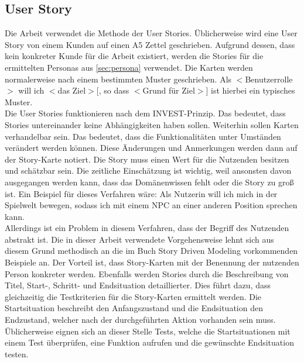 \subsection{User Story}\label{sec:user-story}
Die Arbeit verwendet die Methode der User Stories\cite{scrum-user-stories}.
Üblicherweise wird eine User Story von einem Kunden auf einen A5 Zettel geschrieben.
Aufgrund dessen, dass kein konkreter Kunde für die Arbeit existiert, werden die Stories für die ermittelten Personas aus \autoref{sec:persona} verwendet.
Die Karten werden normalerweise nach einem bestimmten Muster geschrieben.
\glqq Als $<$Benutzerrolle$>$ will ich $<$das Ziel$>$[, so dass $<$Grund für Ziel$>$]\grqq{} ist hierbei ein typisches Muster.\\

Die User Stories funktionieren nach dem \ac{INVEST}-Prinzip\cite{user-stories}.
Das bedeutet, dass Stories untereinander keine Abhängigkeiten haben sollen.
Weiterhin sollen Karten verhandelbar sein.
Das bedeutet, dass die Funktionalitäten unter Umständen verändert werden können.
Diese Änderungen und Anmerkungen werden dann auf der Story-Karte notiert.
Die Story muss einen Wert für die Nutzenden besitzen und schätzbar sein.
Die zeitliche Einschätzung ist wichtig, weil ansonsten davon ausgegangen werden kann, dass das Domänenwissen fehlt oder die Story zu groß ist.
Ein Beispiel für dieses Verfahren wäre: \glqq Als Nutzerin will ich mich in der Spielwelt bewegen, sodass ich mit einem \ac{NPC} an einer anderen Position sprechen kann\grqq{}.\\

Allerdings ist ein Problem in diesem Verfahren, dass der Begriff des Nutzenden abstrakt ist.
Die in dieser Arbeit verwendete Vorgehensweise lehnt sich aus diesem Grund methodisch an die im Buch Story Driven Modeling\cite{story-driven-modeling} vorkommenden Beispiele an.
Der Vorteil ist, dass Story-Karten mit der Benennung der nutzenden Person konkreter werden.
Ebenfalls werden Stories durch die Beschreibung von Titel, Start-, Schritt- und Endsituation detaillierter.
Dies führt dazu, dass gleichzeitig die Testkriterien für die Story-Karten ermittelt werden.
Die Startsituation beschreibt den Anfangszustand und die Endsituation den Endzustand, welcher nach der durchgeführten Aktion vorhanden sein muss.
Üblicherweise eignen sich an dieser Stelle Tests, welche die Startsituationen mit einem Test überprüfen, eine Funktion aufrufen und die gewünschte Endsituation testen.\\

